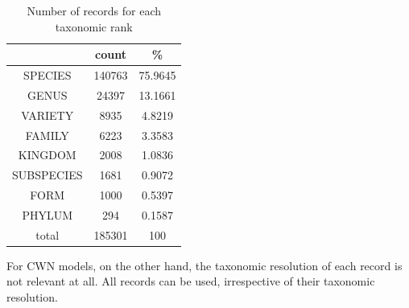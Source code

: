 \documentclass[a4paper]{article}
\begin{document}
\begin{table}[H]
  \caption{Number of records for each taxonomic rank}
  \begin{center}
  \begin{tabular}{c c c}
       & count & \% \\
      \hline
      SPECIES & 140763 & 75.9645\\
      GENUS & 24397 & 13.1661 \\
      VARIETY & 8935 & 4.8219 \\
      FAMILY & 6223 & 3.3583 \\
      KINGDOM & 2008 & 1.0836 \\
      SUBSPECIES & 1681 & 0.9072 \\
      FORM & 1000 & 0.5397 \\
      PHYLUM & 294 & 0.1587 \\
      \hline
      total & 185301 & 100
  \end{tabular}
  \end{center}
  \label{table:dset_taxonomicres_counts}
\end{table}

For CWN models, on the other hand, the taxonomic resolution of each record is not relevant at all. All records can be used, irrespective of their taxonomic resolution.






\end{document}
